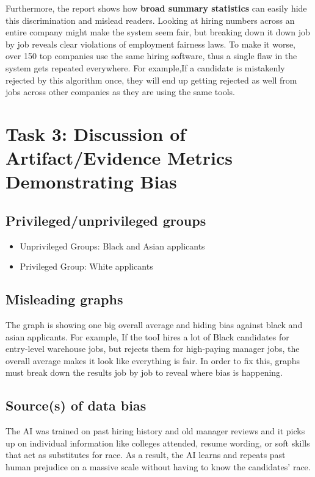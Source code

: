 \documentclass[
	letterpaper, %
]{jdf}
\begin{document}
Furthermore, the report shows how \textbf{broad summary statistics} can easily hide this discrimination and mislead readers. Looking at hiring numbers across an entire company might make the system seem fair, but breaking down it down job by job reveals clear violations of employment fairness laws. To make it worse, over 150 top companies use the same hiring software, thus a single flaw in the system gets repeated everywhere. For example,If a candidate is mistakenly rejected by this algorithm once, they  will end up getting rejected as well from jobs across other companies as they are using the same tools.

\section{Task 3: Discussion of Artifact/Evidence Metrics Demonstrating Bias}
\subsection{Privileged/unprivileged groups}
\begin{itemize}
    \item Unprivileged Groups: Black and Asian applicants
    \item Privileged Group: White applicants
\end{itemize}

\subsection{Misleading graphs}
The graph is showing one big overall average and hiding bias against black and asian applicants. For example, If the tooI hires a lot of Black candidates for entry-level warehouse jobs, but rejects them for high-paying manager jobs, the overall average makes it look like everything is fair. In order to fix this, graphs must break down the results job by job to reveal where bias is happening.

\subsection{Source(s) of data bias}
The AI was trained on past hiring history and old manager reviews and it picks up on individual information like colleges attended, resume wording, or soft skills that act as substitutes for race. As a result, the AI learns and repeats past human prejudice on a massive scale without having to know the candidates’ race.
\end{document}
